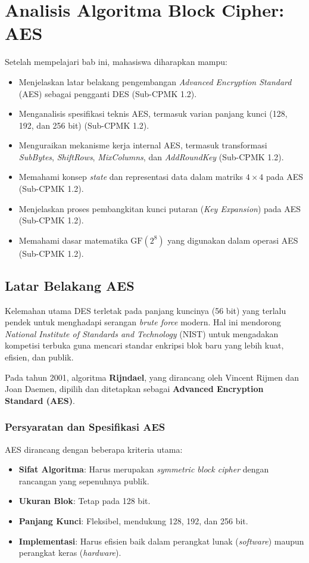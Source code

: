 \documentclass[../main.tex]{subfiles}
\begin{document}
\chapter{Analisis Algoritma Block Cipher: AES}

\begin{learningoutcome}
Setelah mempelajari bab ini, mahasiswa diharapkan mampu:
\begin{itemize}
    \item Menjelaskan latar belakang pengembangan \textit{Advanced Encryption Standard} (AES) sebagai pengganti DES (Sub-CPMK 1.2).
    \item Menganalisis spesifikasi teknis AES, termasuk varian panjang kunci (128, 192, dan 256 bit) (Sub-CPMK 1.2).
    \item Menguraikan mekanisme kerja internal AES, termasuk transformasi \textit{SubBytes}, \textit{ShiftRows}, \textit{MixColumns}, dan \textit{AddRoundKey} (Sub-CPMK 1.2).
    \item Memahami konsep \textit{state} dan representasi data dalam matriks $4 \times 4$ pada AES (Sub-CPMK 1.2).
    \item Menjelaskan proses pembangkitan kunci putaran (\textit{Key Expansion}) pada AES (Sub-CPMK 1.2).
    \item Memahami dasar matematika $\text{GF}(2^8)$ yang digunakan dalam operasi AES (Sub-CPMK 1.2).
\end{itemize}
\end{learningoutcome}

\section{Latar Belakang AES}
Kelemahan utama DES terletak pada panjang kuncinya (56 bit) yang terlalu pendek untuk menghadapi serangan \textit{brute force} modern. Hal ini mendorong \textit{National Institute of Standards and Technology} (NIST) untuk mengadakan kompetisi terbuka guna mencari standar enkripsi blok baru yang lebih kuat, efisien, dan publik.

Pada tahun 2001, algoritma \textbf{Rijndael}, yang dirancang oleh Vincent Rijmen dan Joan Daemen, dipilih dan ditetapkan sebagai \textbf{Advanced Encryption Standard (AES)}.

\subsection{Persyaratan dan Spesifikasi AES}
AES dirancang dengan beberapa kriteria utama:
\begin{itemize}
    \item \textbf{Sifat Algoritma}: Harus merupakan \textit{symmetric block cipher} dengan rancangan yang sepenuhnya publik.
    \item \textbf{Ukuran Blok}: Tetap pada 128 bit.
    \item \textbf{Panjang Kunci}: Fleksibel, mendukung 128, 192, dan 256 bit.
    \item \textbf{Implementasi}: Harus efisien baik dalam perangkat lunak (\textit{software}) maupun perangkat keras (\textit{hardware}).
\end{itemize}
\end{document}

